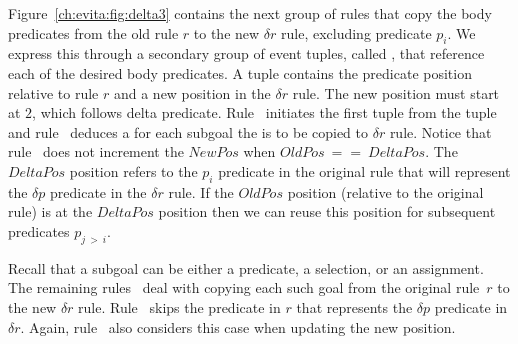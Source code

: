 Figure~\ref{ch:evita:fig:delta3} contains the next group of rules that copy the
body predicates from the old rule $r$ to the new $\delta r$ rule, excluding
predicate $p_i$.  We express this through a secondary group of event tuples,
called , that reference each of the desired body predicates.  A
 tuple contains the predicate position relative to rule $r$ and a
new position in the $\delta r$ rule.  The new position must start at $2$, which
follows delta predicate.  Rule~ initiates the first  tuple
from the  tuple and rule~ deduces a  for each
subgoal the is to be copied to $\delta r$ rule.  Notice that rule~ does
not increment the $NewPos$ when $OldPos\ ==\ DeltaPos$.  The $DeltaPos$
position refers to the $p_i$ predicate in the original rule that will represent
the $\delta p$ predicate in the $\delta r$ rule.  If the $OldPos$ position
(relative to the original rule) is at the $DeltaPos$ position then we can reuse
this position for subsequent predicates $p_{j\ >\ i}$.

Recall that a subgoal can be either a predicate, a selection, or an assignment.
The remaining rules~ deal with copying each such goal from the
original rule~$r$ to the new $\delta r$ rule.  Rule~ skips the predicate
in $r$ that represents the $\delta p$ predicate in $\delta r$.  Again,
rule~ also considers this case when updating the new position.

